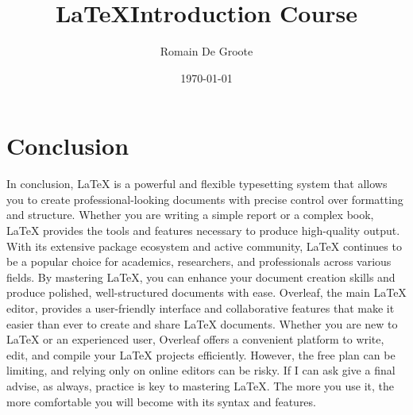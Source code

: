 \documentclass{article}
\title{\LaTeX Introduction Course}
\author{Romain De Groote}
\date{\today}
\begin{document}
\maketitle %

\newpage %

\tableofcontents %






\section*{Conclusion} %

In conclusion, LaTeX is a powerful and flexible typesetting system that allows you to create professional-looking documents with precise control over formatting and structure. Whether you are writing a simple report or a complex book, LaTeX provides the tools and features necessary to produce high-quality output. With its extensive package ecosystem and active community, LaTeX continues to be a popular choice for academics, researchers, and professionals across various fields. By mastering LaTeX, you can enhance your document creation skills and produce polished, well-structured documents with ease. Overleaf, the main LaTeX editor, provides a user-friendly interface and collaborative features that make it easier than ever to create and share LaTeX documents. Whether you are new to LaTeX or an experienced user, Overleaf offers a convenient platform to write, edit, and compile your LaTeX projects efficiently. However, the free plan can be limiting, and relying only on online editors can be risky.\newline
If I can ask give a final advise, as always, practice is key to mastering LaTeX. The more you use it, the more comfortable you will become with its syntax and features.
\end{document}
